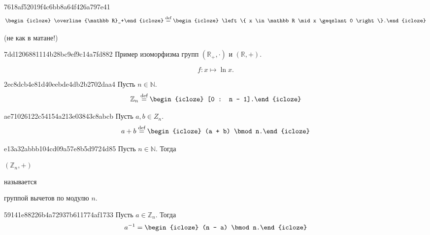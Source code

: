 \begin{note}{7618af52019f4c6bb8a64f426a797e41}
    \[
        \begin{icloze}{2}\overline{\mathbb R}_+\end{icloze} \overset{\text{def}}= \begin{icloze}{1}\left\{ x \in \mathbb R \mid x \geqslant 0 \right\}.\end{icloze}
    \]

    \begin{center}
        \tiny
        (не как в матане!)
    \end{center}
\end{note}

\begin{note}{7dd1206881114b28bc9ef9c14a7fd882}
    Пример изоморфизма групп \({ (\mathbb R_+, \cdot) }\) и \({ (\mathbb R, +) }\).

    \begin{cloze}{1}
        \[
            f : x \mapsto \ln x.
        \]
    \end{cloze}
\end{note}

\begin{note}{2ec8dcb4e81d40eebde4db2b2702daa4}
    Пусть \({ n \in \mathbb N }\).
    \[
        \mathbb Z_{n} \overset{\text{def}}= \begin{icloze}{1}[0 : n - 1].\end{icloze}
    \]
\end{note}

\begin{note}{ae71026122c54154a213e03843c8abcb}
    Пусть \({ a, b \in Z_n }\).
    \[
        a + b \overset{\text{def}}= \begin{icloze}{1}(a + b) \bmod n.\end{icloze}
    \]
\end{note}

\begin{note}{e13a32abbb104cd09a57e8b5d9724d85}
    Пусть \({ n \in \mathbb N }\).
    Тогда \begin{icloze}{2}\({ (\mathbb Z_{n}, +) }\)\end{icloze} называется \begin{icloze}{1}группой вычетов по модулю \({ n }\).\end{icloze}
\end{note}

\begin{note}{59141e88226b4a72937b611774af1733}
    Пусть \({ a \in \mathbb Z_{n} }\).
    Тогда
    \[
        a^{-1} = \begin{icloze}{1}(n - a) \bmod n.\end{icloze}
    \]
\end{note}


